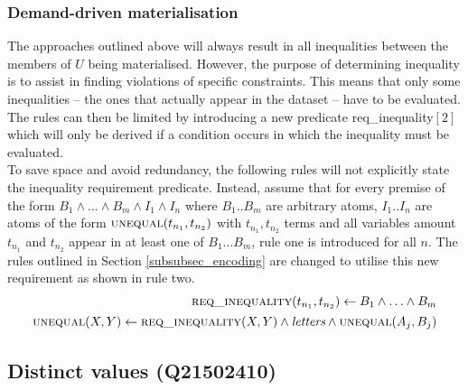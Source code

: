 \documentclass[hyperref,bachelorofscience,fleqn]{cgvpub}
\begin{document}
\subsubsection{Demand-driven materialisation}\label{subsubsec_demand-driven_materialisation}
The approaches outlined above will always result in all inequalities between the members of \(U\) being materialised. However, the purpose of determining inequality is to assist in finding violations of specific constraints. This means that only some inequalities -- the ones that actually appear in the dataset -- have to be evaluated. The rules can then be limited by introducing a new predicate req\_inequality\([2]\) which will only be derived if a condition occurs in which the inequality must be evaluated.\\

To save space and avoid redundancy, the following rules will not explicitly state the inequality requirement predicate. Instead, assume that for every premise of the form \(B_1 \wedge \ldots\wedge B_m \wedge I_1 \wedge I_n\) where \(B_1 .. B_m\) are arbitrary atoms, \(I_1 .. I_n\) are atoms of the form \(\textsc{unequal}(t_{n_1}, t_{n_2})\) with \(t_{n_1}, t_{n_2}\) terms and all variables amount \(t_{n_1}\) and \(t_{n_2}\) appear in at least one of \(B_1 \ldots B_m\), rule one is introduced for all \(n\). The rules outlined in Section \ref{subsubsec_encoding} are changed to utilise this new requirement as shown in rule two.
\begin{align}
\begin{split}
\textsc{req\_inequality}(t_{n_1}, t_{n_2})
 \leftarrow B_1 \wedge \ldots \wedge B_m
\end{split}\\
\begin{split}
\textsc{unequal}(X, Y) \leftarrow \textsc{req\_inequality}	(X, Y) \wedge \emph{letters} \wedge \textsc{unequal}(A_j, B_j)
\end{split}
\end{align}

\subsection{Distinct values (Q21502410)}\label{subsec_distinct_values}
\end{document}
